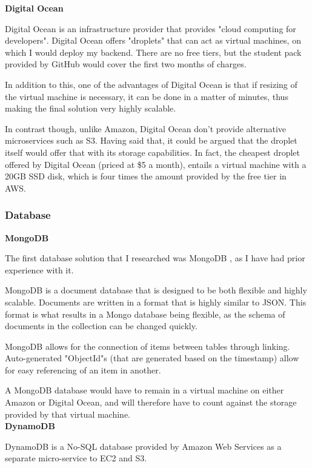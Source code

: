 \documentclass[12pt]{article}
\begin{document}
\textbf{Digital Ocean}

Digital Ocean \cite{digitalOcean} is an infrastructure provider that provides "cloud computing for developers". Digital Ocean offers "droplets" that can act as virtual machines, on which I would deploy my backend. There are no free tiers, but the student pack provided by GitHub \cite{github} would cover the first two months of charges. 

In addition to this, one of the advantages of Digital Ocean is that if resizing of the virtual machine is necessary, it can be done in a matter of minutes, thus making the final solution very highly scalable.

In contrast though, unlike Amazon, Digital Ocean don't provide alternative microservices such as S3. Having said that, it could be argued that the droplet itself would offer that with its storage capabilities. In fact, the cheapest droplet offered by Digital Ocean (priced at \$5 a month), entails a virtual machine with a 20GB SSD disk, which is four times the amount provided by the free tier in AWS.

\subsubsection{Database}

\textbf{MongoDB}

The first database solution that I researched was MongoDB \cite{mongodb}, as I have had prior experience with it. 

MongoDB is a document database that is designed to be both flexible and highly scalable. Documents are written in a format that is highly similar to JSON. This format is what results in a Mongo database being flexible, as the schema of documents in the collection can be changed quickly. 

MongoDB allows for the connection of items between tables through linking. Auto-generated "ObjectId"s (that are generated based on the timestamp) allow for easy referencing of an item in another.

A MongoDB database would have to remain in a virtual machine on either Amazon or Digital Ocean, and will therefore have to count against the storage provided by that virtual machine. \\

\textbf{DynamoDB}

DynamoDB \cite{dynamodb} is a No-SQL database provided by Amazon Web Services as a separate micro-service to EC2 and S3. 
\end{document}
